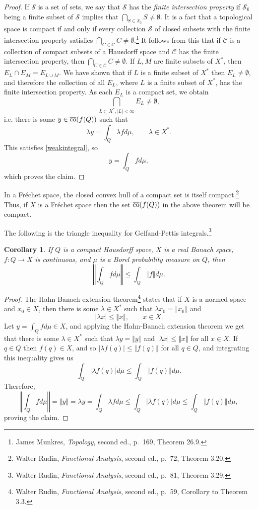 \documentclass{article}
\newcommand{\cco}{\overline{\ensuremath\mathrm{co}}}
\newcommand{\norm}[1]{\left\Vert #1 \right\Vert}
\newtheorem{corollary}[theorem]{Corollary}
\theoremstyle{definition}
\begin{document}
\begin{proof}
If $\mathscr{S}$ is a set of sets, we say that $\mathscr{S}$ has the {\em finite intersection property} if 
 $\mathscr{S}_0$ being a finite  subset of $\mathscr{S}$ implies that
$\bigcap_{S \in \mathscr{S}_0} S \neq \emptyset$.
It is a fact that a topological space is compact if and only if  every collection $\mathscr{S}$ of closed subsets with the finite intersection
property satisfies $\bigcap_{C \in \mathscr{C}} C \neq \emptyset$.\footnote{James Munkres, {\em Topology}, second ed., p.~169, Theorem 26.9.}
It follows from this that if $\mathscr{C}$ is a collection of compact subsets of a Hausdorff space and $\mathscr{C}$ has
the finite intersection property, then $\bigcap_{C \in \mathscr{C}} C \neq \emptyset$. 
If $L,M$ are finite subsets of $X^*$, then $E_L \cap E_M = E_{L \cup M}$.
We have shown that if $L$ is a finite subset of $X^*$ then $E_L \neq \emptyset$, and therefore
the collection of all $E_L$, where $L$ is a finite subset of $X^*$, has the finite intersection property. As each $E_L$
is a compact set, we obtain
\[
\bigcap_{L \subset X^*, |L|<\infty} E_L \neq \emptyset,
\]
i.e. there is some $y \in \cco(f(Q))$ such that 
\[
\lambda y = \int_Q \lambda f d\mu, \qquad \lambda \in X^*.
\]
This satisfies \eqref{weakintegral}, so
\[
y=\int_Q f d\mu,
\]
which proves the claim.
\end{proof}

In a Fr\'echet space, the closed convex hull of a compact set is itself compact.\footnote{Walter Rudin,
{\em Functional Analysis}, second ed., p.~72, Theorem 3.20.} Thus, if $X$ is a Fr\'echet space then the set $\cco(f(Q))$ in the above theorem will
be compact.

The following is the triangle inequality for Gelfand-Pettis integrals.\footnote{Walter Rudin,
{\em Functional Analysis}, second ed., p.~81, Theorem 3.29.}

\begin{corollary}
If $Q$ is a compact Hausdorff space, $X$ is a real Banach space, $f:Q \to X$ is continuous, and $\mu$ is a   Borel probability
measure on $Q$, then 
\[
\norm{\int_Q  fd\mu} \leq \int_Q \norm{f} d\mu.
\]
\end{corollary}
\begin{proof}
The Hahn-Banach extension theorem\footnote{Walter Rudin, {\em Functional Analysis}, second ed., p.~59,
Corollary to Theorem 3.3.} states that if $X$ is a normed space and $x_0 \in X$, then there is some $\lambda \in
X^*$ such that $\lambda x_0= \norm{x_0}$ and
\[
|\lambda x| \leq \norm{x}, \qquad x \in X.
\]
Let $y = \int_Q fd\mu \in X$, and applying the Hahn-Banach extension theorem we get that there is some $\lambda \in X^*$ such that 
$\lambda y= \norm{y}$
 and $|\lambda x| \leq \norm{x}$ for all $x \in X$.
If $q \in Q$ then $f(q) \in X$, and so $|\lambda f(q)| \leq \norm{f(q)}$ for all $q \in Q$, and integrating
this inequality gives us
\[
 \int_Q |\lambda f(q)| d\mu \leq \int_Q \norm{f(q)} d\mu.
\]
Therefore,
\[
\norm{ \int_Q fd\mu} = \norm{y} = \lambda y = \int_Q \lambda f d\mu \leq
\int_Q |\lambda f(q)| d\mu 
\leq
 \int_Q \norm{f(q)} d\mu,
\]
proving the claim.
\end{proof}
\end{document}
